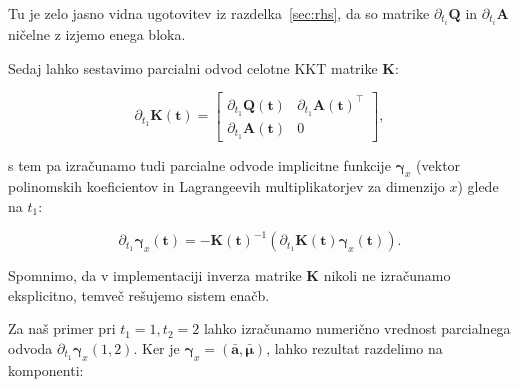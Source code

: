 \documentclass[isrm2, tisk]{fmfdelo}
\newcommand{\aimplicit}{\bar{\mathbf{a}}}
\newcommand{\muimplicit}{\bar{\boldsymbol{\mu}}}
\newcommand{\yimplicit}{\mathbf{\gamma}}
\newcommand{\qmat}{\mathbf{Q}}
\newcommand{\amat}{\mathbf{A}}
\newcommand{\kmat}{\mathbf{K}}
\newcommand{\tvec}{\mathbf{t}}
\begin{document}
Tu je zelo jasno vidna ugotovitev iz razdelka~\ref{sec:rhs}, da so matrike $\partial_{t_i} \qmat$ in $\partial_{t_i} \amat$ ničelne z izjemo enega bloka.

Sedaj lahko sestavimo parcialni odvod celotne KKT matrike $\kmat$:

\begin{equation}
\partial_{t_1} \kmat(\tvec) =
\begin{bmatrix}
    \partial_{t_1} \qmat(\tvec) & \partial_{t_1} \amat(\tvec)^\top \\
    \partial_{t_1} \amat(\tvec) & 0
\end{bmatrix},
\end{equation}

s tem pa izračunamo tudi parcialne odvode implicitne funkcije $\yimplicit_x$ (vektor polinomskih koeficientov in Lagrangeevih multiplikatorjev za dimenzijo $x$) glede na $t_1$:

\begin{equation}
\partial_{t_1} \yimplicit_x(\tvec) = -\kmat(\tvec)^{-1} (\partial_{t_1} \kmat(\tvec) \yimplicit_x(\tvec)).
\end{equation}

Spomnimo, da v implementaciji inverza matrike $\kmat$ nikoli ne izračunamo eksplicitno, temveč rešujemo sistem enačb.

Za naš primer pri $t_1 = 1, t_2 = 2$ lahko izračunamo numerično vrednost parcialnega odvoda $\partial_{t_1} \yimplicit_x(1, 2)$. Ker je $\yimplicit_x = (\aimplicit, \muimplicit)$, lahko rezultat razdelimo na komponenti:
\end{document}
